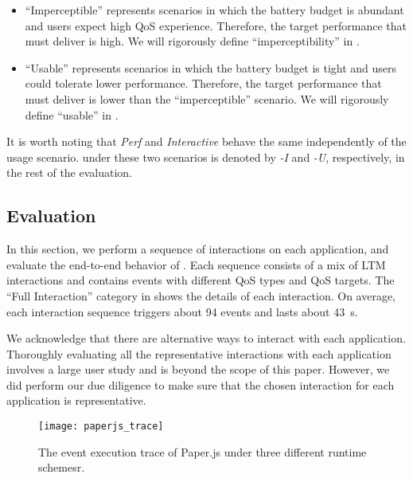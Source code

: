 \begin{itemize}
  \item ``Imperceptible'' represents scenarios in which the battery budget is abundant and users expect high QoS experience. Therefore, the target performance that \webrt must deliver is high. We will rigorously define ``imperceptibility'' in .
  
  \item ``Usable'' represents scenarios in which the battery budget is tight and users could tolerate lower performance. Therefore, the target performance that \webrt must deliver is lower than the ``imperceptible'' scenario. We will rigorously define ``usable'' in .
\end{itemize}

It is worth noting that \textit{Perf} and \textit{Interactive} behave the same independently of the usage scenario. \ebs under these two scenarios is denoted by \textit{\ebs-I} and \textit{\ebs-U}, respectively, in the rest of the evaluation.



\subsection{Evaluation}
\label{sec:runtime:ebs:eval}

In this section, we perform a sequence of interactions on each application, and evaluate the end-to-end behavior of \ebs. Each sequence consists of a mix of LTM interactions and contains events with different QoS types and QoS targets. The ``Full Interaction'' category in  shows the details of each interaction. On average, each interaction sequence triggers about 94 events and lasts about 43~s.

We acknowledge that there are alternative ways to interact with each application. Thoroughly evaluating all the representative interactions with each application involves a large user study and is beyond the scope of this paper. However, we did perform our due diligence to make sure that the chosen interaction for each application is representative.

\begin{figure}[t]
\centering
\texttt{[image: paperjs\_trace]}
\caption{The event execution trace of Paper.js under three different runtime schemesr.}
\label{fig:paperjs_trace}
\end{figure}

